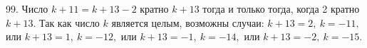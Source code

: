 99. Число $k+11=k+13-2$ кратно $k+13$ тогда и только тогда, когда 2 кратно $k+13.$ Так как число $k$ является целым, возможны случаи: $k+13=2,\ k=-11,$ или $k+13=1,\ k=-12,$ или $k+13=-1,\ k=-14,$ или $k+13=-2,\ k=-15.$\\
